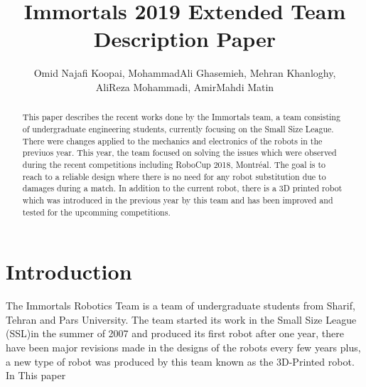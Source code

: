 \documentclass[runningheads,a4paper]{llncs}
\title{Immortals 2019 Extended Team Description Paper}
\author{\normalsize Omid Najafi Koopai{\textsupsub{\small\texttt{1}}{}}, 
MohammadAli Ghasemieh{\textsupsub{\small\texttt{2}}{}}, 
Mehran Khanloghy{\textsupsub{\small\texttt{3}}{}}, \\
\normalsize AliReza Mohammadi{\textsupsub{\small\texttt{3}}{}}, 
AmirMahdi Matin{\textsupsub{\small\texttt{3}}{}}
}
\institute{Sharif University of Technology, \\
\texttt{http://devoted-web-site.url}}
\begin{document}
\maketitle


%
%

\begin{abstract}
This paper describes the recent works done by the Immortals team, a team consisting of undergraduate engineering students, currently focusing on the Small Size League. There were changes applied to the mechanics and electronics of the robots in the previuos year. This year, the team focused on solving the issues which were observed during the recent competitions including RoboCup 2018, Montréal. The goal is to reach to a reliable design where there is no need for any robot substitution due to damages during a match. In addition to the current robot, there is a 3D printed robot which was introduced in the previous year by this team and has been improved and tested for the upcomming competitions.

\end{abstract}


\justify
\section{Introduction}
The Immortals Robotics Team is a team of undergraduate students from Sharif, Tehran and Pars University. The team started its work in the Small Size League (SSL)in the summer of 2007 and produced its first robot after one year, there have been major revisions made in the designs of the robots every few years plus, a new type of robot was produced by this team known as the 3D-Printed robot.
In This paper
\end{document}
